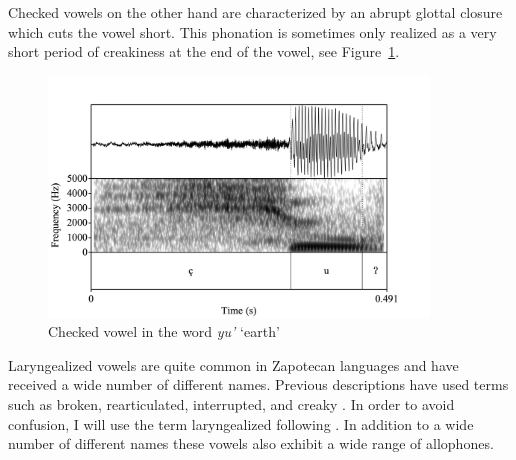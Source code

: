 \documentclass[12pt, letterpaper]{article}
\begin{document}
Checked vowels on the other hand are characterized by an abrupt glottal closure which cuts the vowel short. This phonation is sometimes only realized as a very short period of creakiness at the end of the vowel, see Figure~\ref{fig:CheckedVowel}.  

\begin{figure}[!h]
	\centering
	\includegraphics[width=0.9\textwidth]{RD_yu'.png}
	\caption{Checked vowel in the word \textit{yu'} `earth'}
	\label{fig:CheckedVowel}
\end{figure}

Laryngealized vowels are quite common in Zapotecan languages and have received a wide number of different names. Previous descriptions have used terms such as broken, rearticulated, interrupted, and creaky \citep{longDiccionarioZapotecoSan2005,avelinobecerraTopicsYalalagZapotec2004,avelinoAcousticElectroglottographicAnalyses2010,sonnenscheinDescriptiveGrammarSan2005,adlerAcousticsPhonationTypes2016}. In order to avoid confusion, I will use the term laryngealized following \citet{avelinoAcousticElectroglottographicAnalyses2010}. In addition to a wide number of different names these vowels also exhibit a wide range of allophones. 
\end{document}
